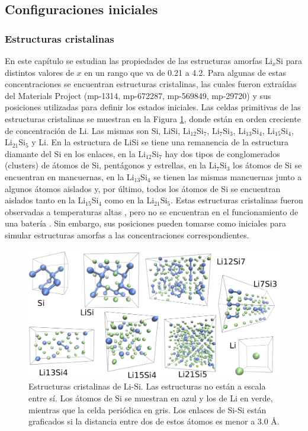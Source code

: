 \subsection{Configuraciones iniciales}

\subsubsection{Estructuras cristalinas}

En este capítulo se estudian las propiedades de las estructuras amorfas Li$_x$Si
para distintos valores de $x$ en un rango que va de 0.21 a 4.2. Para algunas de
estas concentraciones se encuentran estructuras cristalinas, las cuales 
fueron extraídas del Materials Project \cite{materials_project} 
(mp-1314, mp-672287, mp-569849, mp-29720) y sus posiciones utilizadas para definir
los estados iniciales. Las celdas primitivas de las estructuras cristalinas se
muestran en la Figura \ref{fig:cristalinas}, donde están en orden creciente de 
concentración de Li. Las mismas son Si, LiSi, Li$_{12}$Si$_7$, Li$_7$Si$_3$, 
Li$_{13}$Si$_4$, Li$_{15}$Si$_4$, Li$_{21}$Si$_5$ y Li. En la estructura de LiSi
se tiene una remanencia de la estructura diamante del Si en los enlaces, en la Li$_{12}$Si$_7$ 
hay dos tipos de conglomerados (clusters) de átomos de Si, pentágonos y estrellas, en la
Li$_7$Si$_3$ los átomos de Si se encuentran en mancuernas, en la Li$_{13}$Si$_4$ 
se tienen las mismas mancuernas junto a algunos átomos aislados y, por último, 
todos los átomos de Si se encuentran aislados tanto en la Li$_{15}$Si$_{4}$ como
en la Li$_{21}$Si$_5$. Estas estructuras cristalinas fueron observadas a 
temperaturas altas \cite{wen1981}, pero no se encuentran en el funcionamiento de
una batería \cite{obrovac2004}. Sin embargo, sus posiciones pueden tomarse como 
iniciales para simular estructuras amorfas a las concentraciones correspondientes.
\begin{figure}[h!]
    \centering
    \includegraphics[width=\textwidth]{Silicio/caracterizacion/metodos/config/cristalinas.png}
    \caption{Estructuras cristalinas de Li-Si. Las estructuras no están a escala 
    entre sí. Los átomos de Si se muestran en azul y los de Li en verde, mientras
    que la celda periódica en gris. Los enlaces de Si-Si están graficados si la 
    distancia entre dos de estos átomos es menor a 3.0 \AA.}
    \label{fig:cristalinas}
\end{figure}

